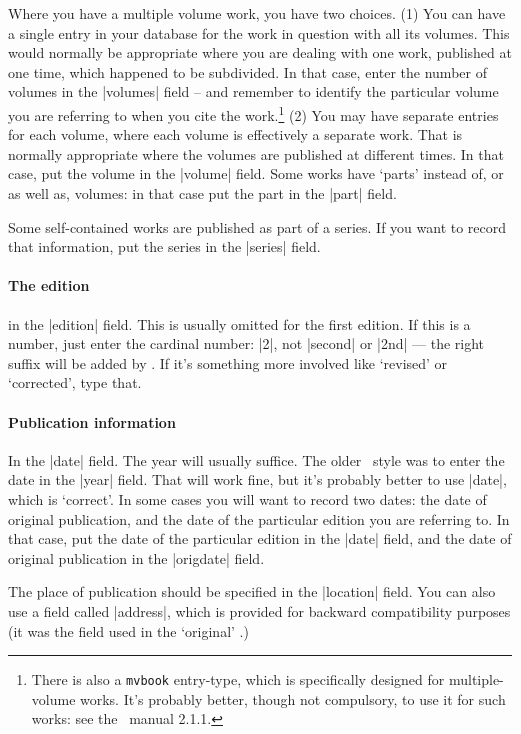 {Where you have a multiple volume work, you have two choices. (1) You can have a single entry in your database for the work in question with all its volumes. This would normally be appropriate where you are dealing with one work, published at one time, which happened to be subdivided. In that case, enter the number of volumes in the |volumes| field -- and remember to identify the particular volume you are referring to when you cite the work.\footnote{There is also a \texttt{mvbook} entry-type, which is specifically designed for multiple-volume works. It's probably better, though not compulsory, to use it for such works: see the \biblatex\ manual 2.1.1.} (2) You may have separate entries for each volume, where each volume is effectively a separate work. That is normally appropriate where the volumes are published at different times. In that case, put the volume in the |volume| field. Some works have `parts' instead of, or as well as, volumes: in that case put the part in the |part| field.

Some self-contained works are published as part of a series. If you want to record that information, put the series in the |series| field.

\paragraph{The edition} in the |edition| field. This is usually omitted for the first edition. If this is a number, just enter the cardinal number: |{2}|, not |second| or |2nd| --- the right suffix will be added by \biblatex. If it's something more involved like `revised' or `corrected', type that.

\paragraph{Publication information} 

In the |date| field. The year will usually suffice. The older \bibtex\ style was to enter the date in the |year| field. That will work fine, but it's probably better to use |date|, which is `correct'. In some cases you will want to record two dates: the date of original publication, and the date of the particular edition you are referring to. In that case, put the date of the particular edition in the |date| field, and the date of original publication in the |origdate| field.

The place of publication should be specified in the |location| field. You can also use a field called |address|, which is provided for backward compatibility purposes (it was the field used in the `original' \bibtex.)

}
